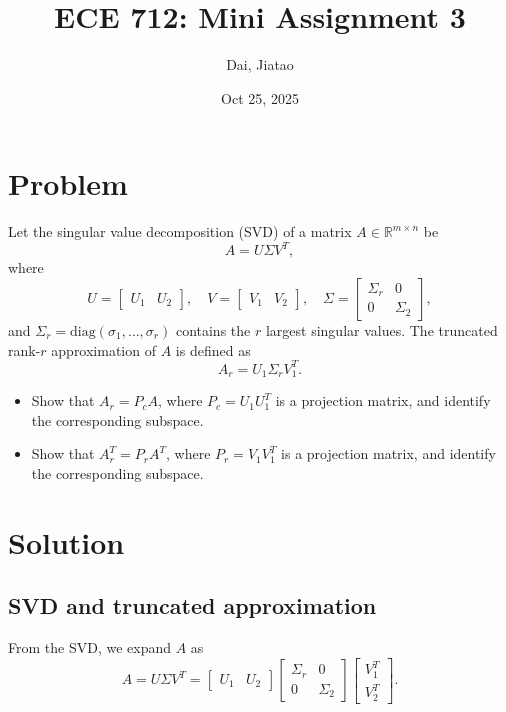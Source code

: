 \documentclass[12pt]{article}
\title{ECE 712: Mini Assignment 3}
\author{Dai, Jiatao}
\date{Oct 25, 2025}
\begin{document}
\maketitle

\section*{Problem}
Let the singular value decomposition (SVD) of a matrix $A \in \mathbb{R}^{m \times n}$ be
\[
A = U \Sigma V^{T},
\]
where
\[
U = \begin{bmatrix} U_1 & U_2 \end{bmatrix}, \quad
V = \begin{bmatrix} V_1 & V_2 \end{bmatrix}, \quad
\Sigma =
\begin{bmatrix}
\Sigma_r & 0 \\
0 & \Sigma_2
\end{bmatrix},
\]
and $\Sigma_r = \mathrm{diag}(\sigma_1,\dots,\sigma_r)$ contains the $r$ largest singular values. The truncated rank-$r$ approximation of $A$ is defined as
\[
A_r = U_1 \Sigma_r V_1^{T}.
\]

\begin{itemize}
    \item Show that $A_r = P_c A$, where $P_c = U_1 U_1^T$ is a projection matrix, and identify the corresponding subspace.
    \item Show that $A_r^T = P_r A^T$, where $P_r = V_1 V_1^T$ is a projection matrix, and identify the corresponding subspace.
\end{itemize}

\section*{Solution}

\subsection*{SVD and truncated approximation}
From the SVD, we expand $A$ as
\[
A = U \Sigma V^T =
\begin{bmatrix} U_1 & U_2 \end{bmatrix}
\begin{bmatrix}
\Sigma_r & 0 \\
0 & \Sigma_2
\end{bmatrix}
\begin{bmatrix} V_1^T \\ V_2^T \end{bmatrix}.
\]
\end{document}
